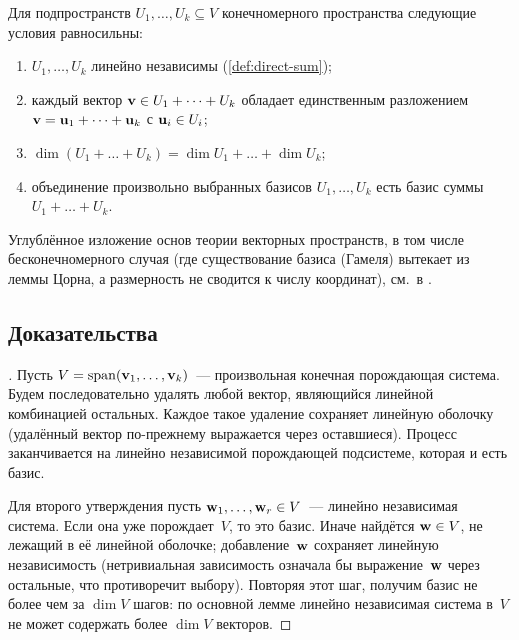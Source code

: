 \begin{theorem}
\label{thm:direct-sum-equiv}
Для подпространств $U_1, \dots, U_k \subseteq V$ конечномерного
пространства следующие условия равносильны:
\begin{enumerate}[label=(\alph*)]
  \item $U_1, \dots, U_k$ линейно независимы (\cref{def:direct-sum});
  \item каждый вектор $\mathbf{v} \in U_1 + \dots + U_k$ обладает
        единственным разложением $\mathbf{v} = \mathbf{u}_1 + \dots + \mathbf{u}_k$
        с $\mathbf{u}_i \in U_i$;
  \item $\dim(U_1 + \dots + U_k) = \dim U_1 + \dots + \dim U_k$;
  \item объединение произвольно выбранных базисов
        $U_1, \dots, U_k$ есть базис суммы $U_1 + \dots + U_k$.
\end{enumerate}
\end{theorem}

\begin{remark}
Углублённое изложение основ теории векторных пространств, в том числе
бесконечномерного случая (где существование базиса (Гамеля) вытекает из
леммы Цорна, а размерность не сводится к числу координат), см.\ в
\cite{Beklemishev2025}.
\end{remark}

\subsection*{Доказательства}

\begin{proof}[]
Пусть $V = \operatorname{span}(\mathbf{v}_1, \dots, \mathbf{v}_k)$~--- произвольная
конечная порождающая система. Будем последовательно удалять любой
вектор, являющийся линейной комбинацией остальных. Каждое такое
удаление сохраняет линейную оболочку (удалённый вектор по-прежнему
выражается через оставшиеся). Процесс заканчивается на линейно
независимой порождающей подсистеме, которая и есть базис.

Для второго утверждения пусть $\mathbf{w}_1, \dots, \mathbf{w}_r \in V$~---
линейно независимая система. Если она уже порождает~$V$, то это базис.
Иначе найдётся $\mathbf{w} \in V$, не лежащий в её линейной оболочке;
добавление~$\mathbf{w}$ сохраняет линейную независимость (нетривиальная
зависимость означала бы выражение~$\mathbf{w}$ через остальные, что
противоречит выбору). Повторяя этот шаг, получим базис не более чем за
$\dim V$ шагов: по основной лемме линейно независимая система в~$V$ не
может содержать более $\dim V$ векторов.
\end{proof}

